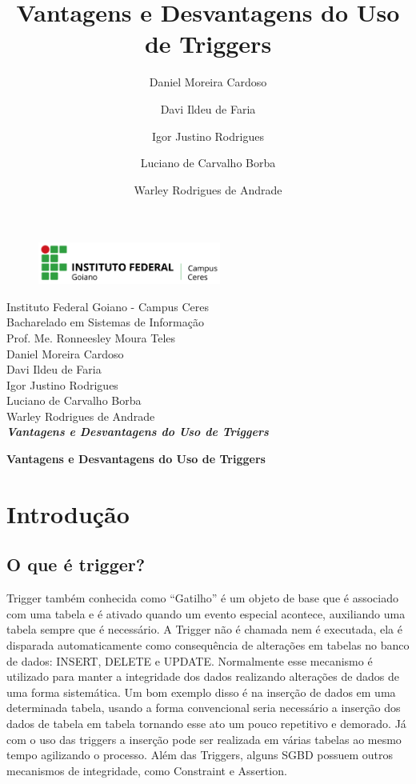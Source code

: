 \documentclass[12pt,a4paper]{article}
\title{Vantagens e Desvantagens do Uso de Triggers}
\author{Daniel Moreira Cardoso \and Davi Ildeu de Faria \and Igor Justino Rodrigues \and Luciano de Carvalho Borba \and Warley Rodrigues de Andrade}
\begin{document}
\begin{titlepage}
\begin{center}
\begin{figure}[htb]
                
                \label{figura:LogoIF}
        
                \centering
                \includegraphics[width=6cm]{recursos/imagens/logo.png} 
\end{figure}
Instituto Federal Goiano - Campus Ceres\\
Bacharelado em Sistemas de Informação\\
Prof. Me. Ronneesley Moura Teles\\\vspace{0.5cm}
Daniel Moreira Cardoso \\
Davi Ildeu de Faria \\
Igor Justino Rodrigues \\
Luciano de Carvalho Borba \\
Warley Rodrigues de Andrade \\
\vspace{5.0cm}
\textit{\textbf{\Large{Vantagens e Desvantagens do Uso de Triggers}}}\\\vspace{0.5cm}
\vspace{9.5cm}
\end{center}
\end{titlepage}
\tableofcontents
\newpage
\begin{center}
\textbf{\Large{Vantagens e Desvantagens do Uso de Triggers}}\\\vspace{0.5cm}
\end{center}
\section{Introdução}
\subsection{O que é trigger?}

Trigger também conhecida como “Gatilho”  é um objeto de base que é associado com uma tabela e é ativado quando um evento especial acontece, auxiliando uma tabela sempre que é necessário.
A Trigger não é chamada nem é executada, ela é disparada automaticamente como consequência de alterações em tabelas no banco de dados: INSERT, DELETE e UPDATE. Normalmente esse mecanismo é utilizado para manter a integridade dos dados realizando alterações de dados de uma forma sistemática. Um bom exemplo disso é na inserção de dados em uma determinada tabela, usando a forma convencional seria necessário a inserção dos dados de tabela em tabela tornando esse ato um pouco repetitivo e demorado. Já com o uso das triggers a inserção pode ser realizada em várias tabelas ao mesmo tempo agilizando o processo.  Além das Triggers, alguns SGBD possuem outros mecanismos de integridade, como Constraint e Assertion.
\end{document}
